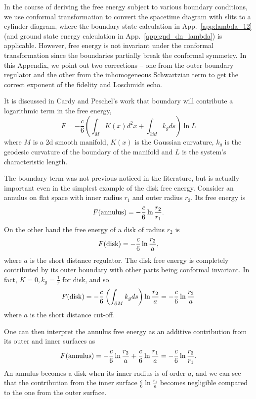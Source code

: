 
In the course of deriving the free energy subject to various boundary conditions, we use conformal transformation to convert the spacetime diagram with slits to a cylinder diagram, where the boundary state calculation in App.~\ref{app:lambda_12} (and ground state energy calculation in App.~\ref{app:gnd_dn_lambda}) is applicable. However, free energy is not invariant under the conformal transformation since the boundaries partially break the conformal symmetry. In this Appendix, we point out two corrections -- one from the outer boundary regulator and the other from the inhomogeneous Schwartzian term to get the correct exponent of the fidelity and Loschmidt echo. 

It is discussed in Cardy and Peschel's work\cite{cardy_finite-size_1988} that boundary will contribute a logarithmic term in the free energy,
\begin{equation}
F = - \frac{c}{6} \left( \int_M  K(x) d^2x + \int_{\partial M} k_g ds \right)  \ln L 
\end{equation}
where $M$ is a 2d smooth manifold, $K(x)$ is the Gaussian curvature, $k_g$ is the geodesic curvature of the boundary of the manifold and $L$ is the system's characteristic length. 

The boundary term was not previous noticed in the literature, but is actually important even in the simplest example of the disk free energy. Consider an annulus on flat space with inner radius $r_1$ and outer radius $r_2$. Its free energy is
\begin{equation}
F({\rm annulus}) = -  \frac{c}{6} \ln \frac{r_2}{r_1} .
\end{equation}
On the other hand the free energy of a disk of radius $r_2$ is
\begin{equation}
  F( {\rm disk} ) = - \frac{c}{6} \ln \frac{r_2}{a},
\end{equation}
where $a$ is the short distance regulator. The disk free energy is completely contributed by its outer boundary with other parts being conformal invariant. In fact, $K = 0, k_g = \frac{1}{r}$ for disk, and so 
\begin{equation}
F( {\rm disk}  ) = - \frac{c}{6}  \left( \int_{\partial M} k_g ds \right)  \ln \frac{r_2}{a}  = - \frac{c}{6}  \ln \frac{r_2}{a}
\end{equation}
where $a$ is the short distance cut-off. 

One can then interpret the annulus free energy as an additive contribution from its outer and inner surfaces as
\begin{equation}
F( {\rm annulus} ) = -  \frac{c}{6} \ln \frac{r_2}{a} +  \frac{c}{6} \ln \frac{r_1}{a} = - \frac{c}{6} \ln \frac{r_2}{r_1}.
\end{equation}
An annulus becomes a disk when its inner radius is of order $a$, and we can see that the contribution from the inner surface $\frac{c}{6} \ln \frac{r_1}{a}$ becomes negligible compared to the one from the outer surface.  


